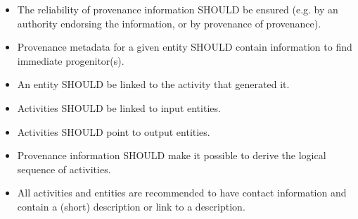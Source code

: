 \begin{itemize}


\item The reliability of provenance information SHOULD be ensured (e.g. by an authority endorsing the information, or by provenance of provenance).

\item Provenance metadata for a given entity SHOULD contain information to find immediate progenitor(s).

\item An entity SHOULD be linked to the activity that generated it.

\item Activities SHOULD be linked to input entities.

\item Activities SHOULD point to output entities.

\item Provenance information SHOULD make it possible to derive the logical sequence of activities.



\item All activities and entities are recommended to have contact information and contain a (short) description or link to a description.

\end{itemize}

